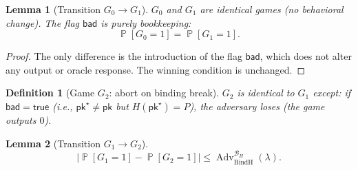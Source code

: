 \documentclass[11pt]{article}
\newtheorem{definition}{Definition}
\newtheorem{lemma}{Lemma}
\newcommand{\Prob}{\operatorname{\mathbb{P}}}
\newcommand{\Adv}{\operatorname{Adv}}
\begin{document}
\begin{lemma}[Transition $G_0 \to G_1$]\label{lem:g0g1}
$G_0$ and $G_1$ are identical games (no behavioral change).
The flag $\mathsf{bad}$ is purely bookkeeping:
\[
\Prob[G_0=1] = \Prob[G_1=1].
\]
\end{lemma}

\begin{proof}
The only difference is the introduction of the flag $\mathsf{bad}$, which does not alter any output or oracle response.
The winning condition is unchanged.
\end{proof}

\begin{definition}[Game $G_2$: abort on binding break]
$G_2$ is identical to $G_1$ except: if $\mathsf{bad}=\mathsf{true}$ (i.e., $\mathsf{pk}^\star\neq\mathsf{pk}$ but $H(\mathsf{pk}^\star)=P$), the adversary \emph{loses} (the game outputs $0$).
\end{definition}

\begin{lemma}[Transition $G_1 \to G_2$]\label{lem:g1g2}
\[
|\Prob[G_1=1]-\Prob[G_2=1]| \le \Adv_{\mathrm{BindH}}^{\mathcal{B}_H}(\lambda).
\]
\end{lemma}
\end{document}
